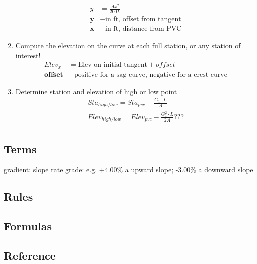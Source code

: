 \documentclass{article}
\begin{document}
\begin{enumerate}
\begin{align*}
        y & = \frac{Ax^2}{200L} \\
        \textbf{y} & - \text{in ft, offset from tangent} \\
        \textbf{x} & - \text{in ft, distance from PVC} 
      \end{align*}
      \item Compute the elevation on the curve at each full station, or any station of interest!
      \begin{align*}
        Elev_x & = \text{Elev on initial tangent} + offset \\
        \textbf{offset} & - \text{positive for a sag curve, negative for a crest curve}
      \end{align*}
      \item Determine station and elevation of high or low point
      \begin{align*}
        Sta_{high/low} = Sta_{pvc} - \frac{G_1 \cdot L}{A} \\
        Elev_{high/low} = Elev_{pvc} - \frac{G_1 ^ 2 \cdot L}{2A}  \textbf{???}\\
      \end{align*}
    \end{enumerate}


  \subsection{Terms}
  gradient: slope rate
  grade: e.g. +4.00\% a upward slope; -3.00\% a downward slope

  \subsection{Rules}

  \subsection{Formulas}

  \subsection{Reference}


\end{document}
